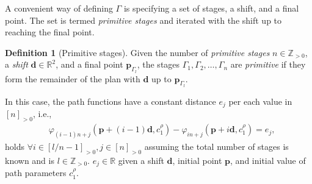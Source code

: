 \documentclass[letterpaper,10pt,journal,twoside]{IEEEtran}
\theoremstyle{definition}
\newtheorem{defn}{Definition}[section]
\begin{document}
A convenient way of defining $\Gamma$ is specifying a set of stages, a shift, and a final point. The set is termed \emph{primitive stages} and iterated with the shift up to reaching the final point.

\begin{defn}[Primitive stages]
  \label{def:primitive}
  Given the number of \emph{primitive stages} $n\in\mathbb{Z}_{>0}$, a \emph{shift} $\mathbf{d}\in\mathbb{R}^2$, and a final point $\mathbf{p}_{\Gamma_l}$, the stages $\Gamma_1,\Gamma_2,\dots,\Gamma_n$ %
  are \emph{primitive} if they form the remainder of the plan with $\mathbf{d}$ up to $\mathbf{p}_{\Gamma_l}$. 
\end{defn}
\noindent In this case, the path functions have a constant distance $e_j$ per each value in $[n]_{>0}$, i.e., 
\begin{equation}\label{eq:primitive}\begin{split}
  &\varphi_{(i-1)n+j}(\mathbf{p}+(i-1)\mathbf{d},c_1^\rho)-\varphi_{in+j}(\mathbf{p}+i\mathbf{d},c_1^\rho)=e_j,
\end{split}\end{equation}
holds $\forall i\in[l/n-1]_{>0},j\in[n]_{>0}$ assuming the total number of stages is known and is $l\in\mathbb{Z}_{>0}$. $e_j\in\mathbb{R}$ given a shift $\mathbf{d}$, initial point $\mathbf{p}$, and initial value of path parameters $c_1^\rho$.
\end{document}

